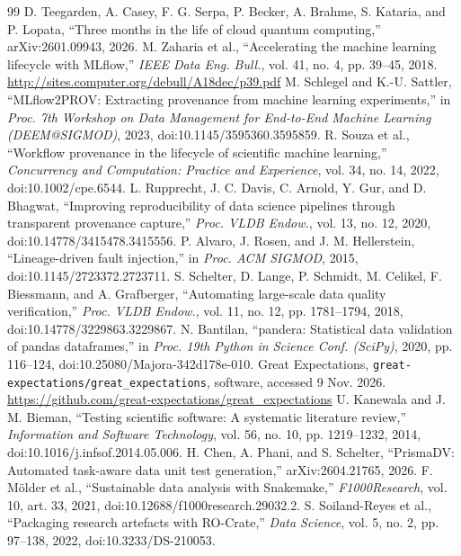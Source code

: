 \documentclass[acmsmall,screen,review]{acmart}
\begin{document}
\begin{thebibliography}{99}
 D. Teegarden, A. Casey, F. G. Serpa, P. Becker, A. Brahme, S. Kataria, and P. Lopata, ``Three months in the life of cloud quantum computing,'' arXiv:2601.09943, 2026.
 M. Zaharia et al., ``Accelerating the machine learning lifecycle with MLflow,'' \textit{IEEE Data Eng. Bull.}, vol. 41, no. 4, pp. 39--45, 2018. {\url{http://sites.computer.org/debull/A18dec/p39.pdf}}
 M. Schlegel and K.-U. Sattler, ``MLflow2PROV: Extracting provenance from machine learning experiments,'' in \textit{Proc. 7th Workshop on Data Management for End-to-End Machine Learning (DEEM@SIGMOD)}, 2023, doi:10.1145/3595360.3595859.
 R. Souza et al., ``Workflow provenance in the lifecycle of scientific machine learning,'' \textit{Concurrency and Computation: Practice and Experience}, vol. 34, no. 14, 2022, doi:10.1002/cpe.6544.
 L. Rupprecht, J. C. Davis, C. Arnold, Y. Gur, and D. Bhagwat, ``Improving reproducibility of data science pipelines through transparent provenance capture,'' \textit{Proc. VLDB Endow.}, vol. 13, no. 12, 2020, doi:10.14778/3415478.3415556.
 P. Alvaro, J. Rosen, and J. M. Hellerstein, ``Lineage-driven fault injection,'' in \textit{Proc. ACM SIGMOD}, 2015, doi:10.1145/2723372.2723711.
 S. Schelter, D. Lange, P. Schmidt, M. Celikel, F. Biessmann, and A. Grafberger, ``Automating large-scale data quality verification,'' \textit{Proc. VLDB Endow.}, vol. 11, no. 12, pp. 1781--1794, 2018, doi:10.14778/3229863.3229867.
 N. Bantilan, ``pandera: Statistical data validation of pandas dataframes,'' in \textit{Proc. 19th Python in Science Conf. (SciPy)}, 2020, pp. 116--124, doi:10.25080/Majora-342d178e-010.
 Great Expectations, \texttt{great-\allowbreak{}expectations/\allowbreak{}great\_\allowbreak{}expectations}, software, accessed 9 Nov. 2026. {\url{https://github.com/great-expectations/great_expectations}}
 U. Kanewala and J. M. Bieman, ``Testing scientific software: A systematic literature review,'' \textit{Information and Software Technology}, vol. 56, no. 10, pp. 1219--1232, 2014, doi:10.1016/j.infsof.2014.05.006.
 H. Chen, A. Phani, and S. Schelter, ``PrismaDV: Automated task-aware data unit test generation,'' arXiv:2604.21765, 2026.
 F. M\"{o}lder et al., ``Sustainable data analysis with Snakemake,'' \textit{F1000Research}, vol. 10, art. 33, 2021, doi:10.12688/f1000research.29032.2.
 S. Soiland-Reyes et al., ``Packaging research artefacts with RO-Crate,'' \textit{Data Science}, vol. 5, no. 2, pp. 97--138, 2022, doi:10.3233/DS-210053.

\end{thebibliography}
\end{document}
